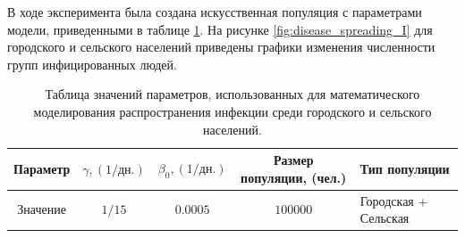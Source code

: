 \documentclass[14pt,a4paper]{article}
\begin{document}
В ходе эксперимента была создана искусственная популяция с параметрами модели, приведенными в таблице \ref{tab:table_paremeters_rural_urban}.
На рисунке \ref{fig:disease_spreading_I} для городского и сельского населений приведены графики изменения численности групп инфицированных людей.  
\begin{table}[h!]
	\centering
	\caption{Таблица значений параметров, использованных для математического моделирования распространения инфекции среди городского и сельского населений.}
	\begin{tabularx}{\textwidth}{|c|c|c|c|X|}
		\hline
		Параметр &  $\gamma,  (1/\text{дн.})$ & $\beta_0,  (1/\text{дн.})$ & Размер популяции, (чел.)& Тип популяции \\
		\hline
		Значение & $1/15$ & $0.0005$ & $100000$ & Городская + Сельская \\
		\hline
	\end{tabularx}
	\label{tab:table_paremeters_rural_urban}
	\vspace{-0.4cm}
\end{table}
\end{document}
